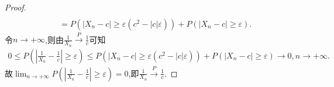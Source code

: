 \documentclass[lang=cn,newtx,10pt,scheme=chinese]{../../Template/elegantbook}
\begin{document}
\begin{proof}
\begin{align*}
    \\
    &= P\left(\left|X_n - c\right| \geqslant \varepsilon(c^2 - |c|\varepsilon)\right) + P\left(\left|X_n - c\right| \geqslant \varepsilon\right).
\end{align*}
令\(n \to +\infty\),则由\(\frac{1}{X_n} \overset{P}{\rightarrow} \frac{1}{c}\)可知
\begin{align*}
   0 \leqslant P\left(\left|\frac{1}{X_n} - \frac{1}{c}\right| \geqslant \varepsilon\right) \leqslant P\left(\left|X_n - c\right| \geqslant \varepsilon(c^2 - |c|\varepsilon)\right) + P\left(\left|X_n - c\right| \geqslant \varepsilon\right) \to 0,n \to +\infty .
\end{align*}
故\(\lim_{n \to +\infty}P\left(\left|\frac{1}{X_n} - \frac{1}{c}\right| \geqslant \varepsilon\right) = 0\),即\(\frac{1}{X_n} \overset{P}{\rightarrow} \frac{1}{c}\).
\end{proof}
\end{document}
